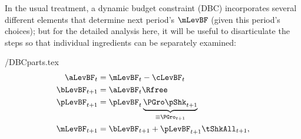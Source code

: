 \documentclass[BufferStockTheory]{subfiles}
\begin{document}
In the usual treatment, a dynamic budget constraint (DBC) incorporates
several different elements that determine next period's $\mLevBF$ (given this
period's choices); but for the detailed analysis here, it will be useful to
disarticulate the steps so that individual ingredients can be separately examined:
\begin{verbatimwrite}{\EqDir/DBCparts.tex}
  \begin{align}
    \aLevBF_{t}    & = \mLevBF_{t}-\cLevBF_{t}  \label{eq:DBCparts} \\
    \bLevBF_{t+1}    & = \aLevBF_{t} \Rfree \notag \\
    \pLevBF_{t+1}  & = \pLevBF_{t} \underbrace{\PGro\pShk_{t+1}}_{\equiv \PGro_{t+1}}  \notag \\
    \mLevBF_{t+1}  & =  \bLevBF_{t+1} +\pLevBF_{t+1}\tShkAll_{t+1},  \notag
  \end{align}
\end{verbatimwrite}
\end{document}
